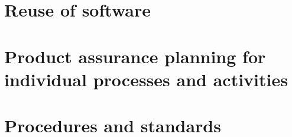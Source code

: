 \section{	Reuse of software}
\section{	Product assurance planning for individual processes and activities}
\section{	Procedures and standards}


\clearpage
